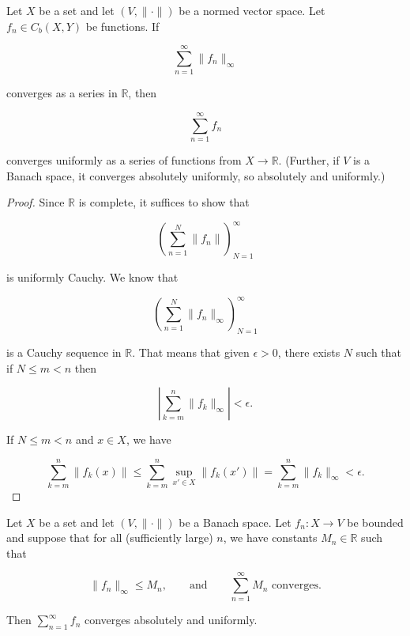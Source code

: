\begin{theorem}\label{ra.thm.Weierstrass}


Let \(X\) be a set and let \((V, \lVert \cdot \rVert)\) be a normed vector space. Let \(f_n \in C_b(X, Y)\) be functions. If 

\[
\sum_{n=1}^\infty \lVert f_n \rVert_\infty
\]

converges as a series in \(\mathbb{R}\), then

\[
\sum_{n=1}^\infty  f_n 
\]

converges uniformly as a series of functions from \(X \to \mathbb{R}\). (Further, if \(V\) is a Banach space, it converges absolutely uniformly, so absolutely and uniformly.)



\end{theorem}

\begin{proof}

Since \(\mathbb{R}\) is complete, it suffices to show that 

\[
\left( \sum_{n=1}^N \lVert  f_n \rVert \right)_{N= 1}^\infty
\]

is uniformly Cauchy. We know that 

\[
\left( \sum_{n=1}^N \lVert  f_n \rVert_\infty \right)_{N= 1}^\infty
\]

is a Cauchy sequence in \(\mathbb{R}\). That means that given \(\epsilon > 0\), there exists \(N\) such that if \(N \leq m < n\) then

\[
\left| \sum_{k=m}^n \lVert  f_k \rVert_\infty  \right| < \epsilon.
\]

If \(N \leq m < n\) and \(x \in X\), we have

\[
\sum_{k=m}^n \lVert f_k(x) \rVert \leq \sum_{k=m}^n \sup_{x' \in X} \lVert f_k(x') \rVert = \sum_{k=m}^n \lVert f_k \rVert_\infty < \epsilon.
\]

\end{proof}

\begin{theorem}

Let \(X\) be a set and let \((V, \lVert \cdot \rVert)\) be a Banach space. Let \(f_n: X \to V\) be bounded and suppose that for all (sufficiently large) \(n\), we have constants \(M_n \in \mathbb{R}\) such that 

\[
\lVert f_n \rVert_\infty \leq M_n, \qquad \text{and} \qquad \sum_{n=1}^\infty M_n \text{ converges.}
\]

Then \(\sum_{n=1}^\infty f_n\) converges absolutely and uniformly.

\end{theorem}


